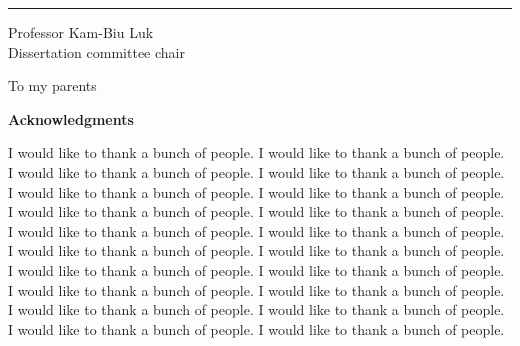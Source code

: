 \documentclass[11pt,oneside]{memoir}
\makeatletter
\def\MyDoubleSpacing{%
\setSpacing{2}%
}
\makeatother
\begin{document}
\normalsize
\MyDoubleSpacing
\noindent  %

\SingleSpacing
\vspace{2.5\baselineskip}
\hfill
\begin{minipage}{0.4\textwidth}
  \hrule\vspace{0.4\baselineskip}
  Professor Kam-Biu Luk\\
  Dissertation committee chair
\end{minipage}

\clearpage
\pagestyle{headings}

\thispagestyle{empty}
\vfill
\begin{vplace}
  \begin{center}
    {\large To my parents}
  \end{center}
\end{vplace}
\clearpage

\MyDoubleSpacing
\thispagestyle{empty}
\begin{center}
  {\large\textbf{Acknowledgments}} 
\end{center}

\noindent \normalsize
I would like to thank a bunch of people. I would like to thank a bunch of people. I would like to thank a bunch of people. I would like to thank a bunch of people. I would like to thank a bunch of people. I would like to thank a bunch of people. I would like to thank a bunch of people. I would like to thank a bunch of people. I would like to thank a bunch of people. I would like to thank a bunch of people. I would like to thank a bunch of people. I would like to thank a bunch of people. I would like to thank a bunch of people. I would like to thank a bunch of people. I would like to thank a bunch of people. I would like to thank a bunch of people. I would like to thank a bunch of people. I would like to thank a bunch of people. I would like to thank a bunch of people. I would like to thank a bunch of people. 
\end{document}
